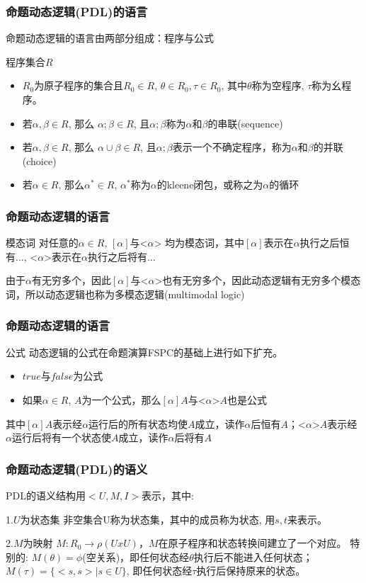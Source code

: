 \documentclass{beamer}
\begin{document}
\begin{frame}
	\frametitle{命题动态逻辑(PDL)的语言}
	命题动态逻辑的语言由两部分组成：程序与公式
	\begin{block}{程序集合$R$}
		\begin{itemize}
	    	\item $R_0$为原子程序的集合且$R_0 \in R$, $\theta \in R_0, \tau \in R_0 $, 其中$\theta$称为空程序, $\tau$称为幺程序。
	    	\item 若$\alpha, \beta \in R $, 那么 $\alpha;\beta \in R$, 且$\alpha;\beta$称为$\alpha$和$\beta$的串联(sequence)
	    	\item 若$\alpha, \beta \in R $, 那么 $\alpha \cup \beta \in R$, 且$\alpha;\beta$表示一个不确定程序，称为$\alpha$和$\beta$的并联(choice)
	    	\item 若$\alpha \in R$, 那么$\alpha ^{*} \in R$, 	$\alpha ^{*}$称为$\alpha$的kleene闭包，或称之为$\alpha$的循环	
		\end{itemize}
	\end{block}
\end{frame}


\begin{frame}
	\frametitle{命题动态逻辑的语言}
	\begin{block}{模态词}
		对任意的$\alpha \in R$, $[\alpha]$与<$\alpha$> 均为模态词，其中$[\alpha]$表示在$\alpha$执行之后恒有..., <$\alpha$>表示在$\alpha$执行之后将有...
	\end{block}
	由于$\alpha$有无穷多个，因此$[\alpha]$与<$\alpha$>也有无穷多个，因此动态逻辑有无穷多个模态词，所以动态逻辑也称为多模态逻辑(multimodal logic)
\end{frame}


\begin{frame}
	\frametitle{命题动态逻辑的语言}
	\begin{block}{公式}
		动态逻辑的公式在命题演算FSPC的基础上进行如下扩充。
		\begin{itemize}
			\item $true$与$false$为公式
			\item 如果$\alpha \in R$, $A$为一个公式，那么$[\alpha]A$与<$\alpha$>$A$也是公式
		\end{itemize}
		其中$[\alpha]A$表示经$\alpha$运行后的所有状态均使$A$成立，读作$\alpha$后恒有$A$；<$\alpha$>$A$表示经$\alpha$运行后将有一个状态使$A$成立，读作$\alpha$后将有$A$
	\end{block}
\end{frame}



\begin{frame}
	\frametitle{命题动态逻辑(PDL)的语义}
	PDL的语义结构用$<U, M, I>$表示，其中:
	\begin{block}{1.$U$为状态集}
		非空集合U称为状态集，其中的成员称为状态, 用$s, t$来表示。
	\end{block}
	\begin{block}{2.$M$为映射}
		$M: R_0 \rightarrow \rho (UxU) $，$M$在原子程序和状态转换间建立了一个对应。
		特别的: $M(\theta) = \phi$(空关系)，即任何状态经$\theta$执行后不能进入任何状态；$M(\tau) = \{<s,s> | s \in U\}$, 即任何状态经$\tau$执行后保持原来的状态。
	\end{block}
\end{frame}
\end{document}
